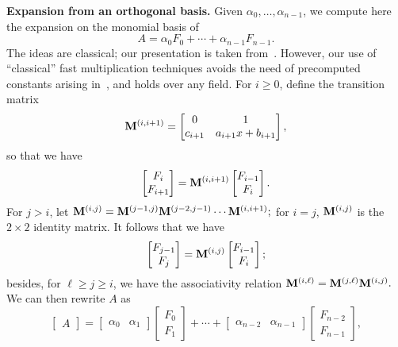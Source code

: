 \documentclass{elsart}
\begin{document}
{\bf Expansion from an orthogonal basis.}
Given $\alpha_0,\dots,\alpha_{n-1}$, we compute here the expansion
on the monomial basis of
$$A=\alpha_0 F_0 + \cdots + \alpha_{n-1} F_{n-1}.$$ The ideas 
are classical; our presentation is taken from~\cite{PoStTa98}. However,
our use of ``classical'' fast multiplication techniques avoids the
need of precomputed constants arising in~\cite{PoStTa98}, and holds
over any field. For $i \ge 0$, define the transition matrix
$${\bf M}^{(i,i+1)} = \left [ \begin{matrix} 0 & 1 \\ c_{i+1} & a_{i+1} x + b_{i+1} \end{matrix} \right ],$$
so that we have
$$\left [ \begin{matrix} F_{i} \\ F_{i+1} \end{matrix} \right ]
 = {\bf M}^{(i,i+1)} \left [ \begin{matrix} F_{i-1} \\ F_{i} \end{matrix} \right ].$$
For  $j > i$, let ${\bf M}^{(i,j)}= {\bf M}^{(j-1,j)}  {\bf M}^{(j-2,j-1)} \cdots {\bf M}^{(i,i+1)};$
for $i=j$, ${\bf M}^{(i,j)}$ is the $2\times 2$ identity matrix.
It follows that we have 
$$\left [ \begin{matrix} F_{j-1} \\ F_{j} \end{matrix} \right ]
 = {\bf M}^{(i,j)} \left [ \begin{matrix} F_{i-1} \\ F_{i} \end{matrix} \right ];$$
besides, for $\ell \ge j \ge i$, we have the associativity relation
${\bf M}^{(i,\ell)} = {\bf M}^{(j,\ell)} {\bf M}^{(i,j)}.$
We can then rewrite $A$ as
$$\left [ \begin{matrix} A \end{matrix} \right ]
= \left [ \begin{matrix} \alpha_0 & \alpha_1 \end{matrix} \right ]
            \left [ \begin{matrix} F_0 \\ F_1 \end{matrix} \right ]  + \cdots + 
            \left [ \begin{matrix} \alpha_{n-2} & \alpha_{n-1} \end{matrix} \right ]
            \left [ \begin{matrix} F_{n-2} \\ F_{n-1} \end{matrix} \right ],$$
\end{document}
